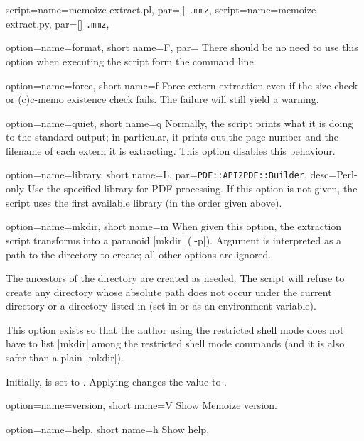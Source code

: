 \documentclass[a4paper,11pt]{article}
\begin{document}
\begin{doc}{
    script={name=memoize-extract.pl, par=[] \texttt{.mmz}},
    script={name=memoize-extract.py, par=[] \texttt{.mmz}},
  }
\begin{doc}{
      option={name=format, short name=F,
        par=\Alt{}\Alt{}}
    }
    There should be no need to use this option when executing the script form
    the command line.
  \end{doc}
  \begin{doc}{
      option={name=force, short name=f}
    }
    Force extern extraction even if the size check or (c)c-memo existence check
    fails.  The failure will still yield a warning.
  \end{doc}
  \begin{doc}{
      option={name=quiet, short name=q}
    }
    Normally, the script prints what it is doing to the standard output; in
    particular, it prints out the page number and the filename of each extern
    it is extracting.  This option disables this behaviour.
  \end{doc}
  \begin{doc}{
    option={name=library, short name=L,
      par=\texttt{PDF::API2\Alt PDF::Builder}, desc=Perl-only}
  }
  Use the specified library for PDF processing.  If this option is not given,
  the script uses the first available library (in the order given above).
  \end{doc}
  \begin{doc}{
      option={name=mkdir, short name=m}
    }
    When given this option, the extraction script transforms into a paranoid
    |mkdir| (|-p|).  Argument \dmmz is interpreted as a path to the
    directory to create; all other options are ignored.

    The ancestors of the directory are created as needed.  The script will
    refuse to create any directory whose absolute path does not occur under the
    current directory or a directory listed in  (set in
     or as an environment variable).

    This option exists so that the author using the restricted shell mode does
    not have to list |mkdir| among the restricted shell mode commands (and it
    is also safer than a plain |mkdir|).

    Initially,  is set to
    . Applying
     changes the value to
    .
  \end{doc}
  \begin{doc}{
      option={name=version, short name=V}
    }
    Show Memoize version.
  \end{doc}
  \begin{doc}{
      option={name=help, short name=h}
    }
    Show help.
  \end{doc}


\end{doc}
\end{document}
